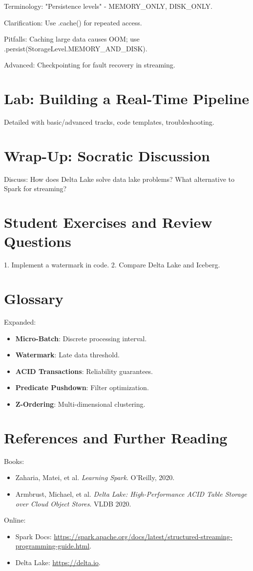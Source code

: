 \documentclass[11pt]{article}
\begin{document}
Terminology: "Persistence levels" - MEMORY_ONLY, DISK_ONLY.

Clarification: Use .cache() for repeated access.

Pitfalls: Caching large data causes OOM; use .persist(StorageLevel.MEMORY_AND_DISK).

Advanced: Checkpointing for fault recovery in streaming.

\section{Lab: Building a Real-Time Pipeline}
Detailed with basic/advanced tracks, code templates, troubleshooting.

\section{Wrap-Up: Socratic Discussion}
Discuss: How does Delta Lake solve data lake problems? What alternative to Spark for streaming?

\section{Student Exercises and Review Questions}
1. Implement a watermark in code.
2. Compare Delta Lake and Iceberg.

\section{Glossary}
Expanded:
\begin{itemize}
    \item \textbf{Micro-Batch}: Discrete processing interval.
    \item \textbf{Watermark}: Late data threshold.
    \item \textbf{ACID Transactions}: Reliability guarantees.
    \item \textbf{Predicate Pushdown}: Filter optimization.
    \item \textbf{Z-Ordering}: Multi-dimensional clustering.
\end{itemize}

\section{References and Further Reading}
Books:
\begin{itemize}
    \item Zaharia, Matei, et al. \textit{Learning Spark}. O'Reilly, 2020.
    \item Armbrust, Michael, et al. \textit{Delta Lake: High-Performance ACID Table Storage over Cloud Object Stores}. VLDB 2020.
\end{itemize}

Online:
\begin{itemize}
    \item Spark Docs: \url{https://spark.apache.org/docs/latest/structured-streaming-programming-guide.html}.
    \item Delta Lake: \url{https://delta.io}.
\end{itemize}
\end{document}

